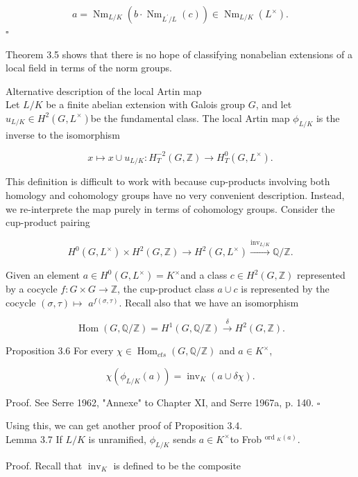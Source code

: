 \documentclass[10pt]{article}
\begin{document}
$$
a=\operatorname{Nm}_{L / K}\left(b \cdot \operatorname{Nm}_{L^{\prime} / L}(c)\right) \in \operatorname{Nm}_{L / K}\left(L^{\times}\right) .
$$ \(\square\)

Theorem 3.5 shows that there is no hope of classifying nonabelian extensions of a local field in terms of the norm groups.

Alternative description of the local Artin map\\
Let $L / K$ be a finite abelian extension with Galois group $G$, and let $u_{L / K} \in H^{2}\left(G, L^{\times}\right)$be the fundamental class. The local Artin map $\phi_{L / K}$ is the inverse to the isomorphism

$$
x \mapsto x \cup u_{L / K}: H_{T}^{-2}(G, \mathbb{Z}) \rightarrow H_{T}^{0}\left(G, L^{\times}\right) .
$$

This definition is difficult to work with because cup-products involving both homology and cohomology groups have no very convenient description. Instead, we re-interprete the map purely in terms of cohomology groups. Consider the cup-product pairing

$$
H^{0}\left(G, L^{\times}\right) \times H^{2}(G, \mathbb{Z}) \longrightarrow H^{2}\left(G, L^{\times}\right) \xrightarrow{\operatorname{inv}_{L / K}} \mathbb{Q} / \mathbb{Z} .
$$

Given an element $a \in H^{0}\left(G, L^{\times}\right)=K^{\times}$and a class $c \in H^{2}(G, \mathbb{Z})$ represented by a cocycle $f: G \times G \rightarrow \mathbb{Z}$, the cup-product class $a \cup c$ is represented by the cocycle $(\sigma, \tau) \mapsto$ $a^{f(\sigma, \tau)}$. Recall also that we have an isomorphism

$$
\operatorname{Hom}(G, \mathbb{Q} / \mathbb{Z})=H^{1}(G, \mathbb{Q} / \mathbb{Z}) \xrightarrow{\delta} H^{2}(G, \mathbb{Z}) .
$$

Proposition 3.6 For every $\chi \in \operatorname{Hom}_{c t s}(G, \mathbb{Q} / \mathbb{Z})$ and $a \in K^{\times}$,

$$
\chi\left(\phi_{L / K}(a)\right)=\operatorname{inv}_{K}(a \cup \delta \chi) .
$$

Proof. See Serre 1962, "Annexe" to Chapter XI, and Serre 1967a, p. 140. \(\square\)

Using this, we can get another proof of Proposition 3.4.\\
Lemma 3.7 If $L / K$ is unramified, $\phi_{L / K}$ sends $a \in K^{\times}$to Frob $^{\text {ord }_{K}(a)}$.

Proof. Recall that $\operatorname{inv}_{K}$ is defined to be the composite
\end{document}
